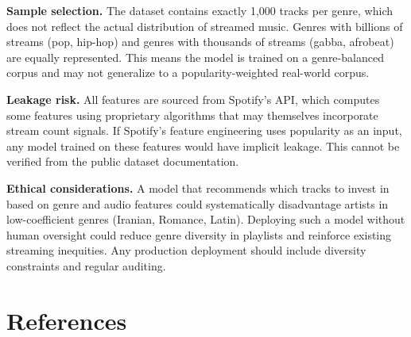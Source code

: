 \documentclass[12pt, oneside]{book}
\begin{document}
\textbf{Sample selection.} The dataset contains exactly 1{,}000 tracks per genre, which does not reflect the actual distribution of streamed music. Genres with billions of streams (pop, hip-hop) and genres with thousands of streams (gabba, afrobeat) are equally represented. This means the model is trained on a genre-balanced corpus and may not generalize to a popularity-weighted real-world corpus.
 
\textbf{Leakage risk.} All features are sourced from Spotify's API, which computes some features using proprietary algorithms that may themselves incorporate stream count signals. If Spotify's feature engineering uses popularity as an input, any model trained on these features would have implicit leakage. This cannot be verified from the public dataset documentation.
 
\textbf{Ethical considerations.} A model that recommends which tracks to invest in based on genre and audio features could systematically disadvantage artists in low-coefficient genres (Iranian, Romance, Latin). Deploying such a model without human oversight could reduce genre diversity in playlists and reinforce existing streaming inequities. Any production deployment should include diversity constraints and regular auditing.
 
\backmatter
 
\chapter*{References}
 
\end{document}
